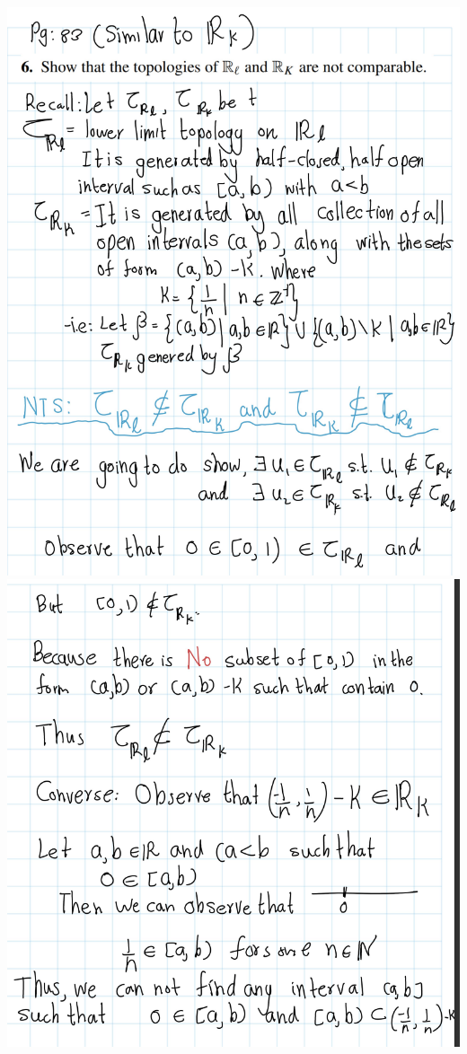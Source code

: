 \documentclass[
]{book}
\theoremstyle{definition}
\theoremstyle{definition}
\theoremstyle{definition}
\theoremstyle{definition}
\theoremstyle{remark}
\begin{document}
\includegraphics{figures/Exercises/Ex 2.13/ex-6-1.png}
\includegraphics{figures/Exercises/Ex 2.13/ex-6-2.png}
\end{document}
